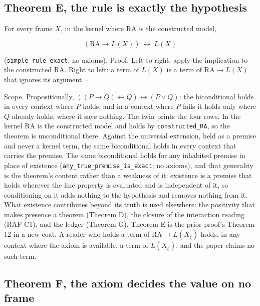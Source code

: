 \documentclass[10pt]{article}
\begin{document}
\hypertarget{theorem-e-the-rule-is-exactly-the-hypothesis}{%
\subsection{Theorem E, the rule is exactly the
hypothesis}\label{theorem-e-the-rule-is-exactly-the-hypothesis}}

For every frame \(X\), in the kernel where \(\mathrm{RA}\) is the
constructed model,

\[(\mathrm{RA} \to L(X)) \ \leftrightarrow\ L(X)\]

(\texttt{simple\_\allowbreak rule\_\allowbreak exact}; no axioms).
Proof. Left to right: apply the implication to the constructed
\(\mathrm{RA}\). Right to left: a term of \(L(X)\) is a term of
\(\mathrm{RA} \to L(X)\) that ignores its argument. \(\square\)

Scope. Propositionally,
\(((P \to Q) \leftrightarrow Q) \leftrightarrow (P \vee Q)\): the
biconditional holds in every context where \(P\) holds, and in a context
where \(P\) fails it holds only where \(Q\) already holds, where it says
nothing. The twin prints the four rows. In the kernel \(\mathrm{RA}\) is
the constructed model and holds by \texttt{constructed\_\allowbreak RA},
so the theorem is unconditional there. Against the universal extension,
held as a premise and never a kernel term, the same biconditional holds
in every context that carries the premise. The same biconditional holds
for any inhabited premise in place of existence
(\texttt{any\_\allowbreak true\_\allowbreak premise\_\allowbreak is\_\allowbreak exact};
no axioms), and that generality is the theorem's content rather than a
weakness of it: existence is a premise that holds wherever the line
property is evaluated and is independent of it, so conditioning on it
adds nothing to the hypothesis and removes nothing from it. What
existence contributes beyond its truth is used elsewhere: the positivity
that makes presence a theorem (Theorem D), the closure of the
interaction reading (RAF-C1), and the ledger (Theorem G). Theorem E is
the prior proof's Theorem 12 in a new coat. A reader who holds a term of
\(\mathrm{RA} \to L(X_\xi)\) holds, in any context where the axiom is
available, a term of \(L(X_\xi)\), and the paper claims no such term.

\hypertarget{theorem-f-the-axiom-decides-the-value-on-no-frame}{%
\subsection{Theorem F, the axiom decides the value on no
frame}\label{theorem-f-the-axiom-decides-the-value-on-no-frame}}
\end{document}
